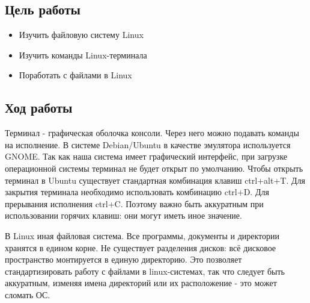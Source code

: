 \subsection{Цель работы}
\begin{itemize}
    \item Изучить файловую систему Linux
    \item Изучить команды Linux-терминала
    \item Поработать с файлами в Linux
\end{itemize}
\subsection{Ход работы}

Терминал - графическая оболочка консоли. Через него можно подавать команды на исполнение. В системе Debian/Ubuntu в качестве эмулятора используется GNOME. Так как наша система имеет графический интерфейс, при загрузке операционной системы терминал не будет открыт по умолчанию. Чтобы открыть терминал в Ubuntu существует стандартная комбинация клавиш ctrl+alt+T. Для закрытия терминала необходимо использовать комбинацию ctrl+D. Для прерывания исполнения ctrl+C. Поэтому важно быть аккуратным при использовании горячих клавиш: они могут иметь иное значение. 

В Linux иная файловая система. Все программы, документы и директории хранятся в едином корне. Не существует разделения дисков: всё дисковое пространство монтируется в единую директорию. Это позволяет стандартизировать работу с файлами в linux-системах, так что следует быть аккуратным, изменяя имена директорий или их расположение - это может сломать ОС. 

